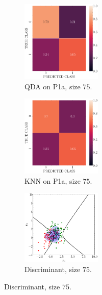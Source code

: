 \documentclass[11pt, a4 paper]{article}
\begin{document}
\begin{figure}[!htbp]
\quad    
    \begin{subfigure}[!htbp]{0.24\textwidth}
       \centering
       \includegraphics[width=1.5in]{../results/ex1/conf_mtx_QD_ML_dataset_P1a_size_75.pdf}
       \caption{QDA on P1a, size $75$.}
       \label{fig:QDA_P1a_75}
    \end{subfigure}
\quad    
    \begin{subfigure}[!htbp]{0.24\textwidth}
       \centering
       \includegraphics[width=1.5in]{../results/ex1/conf_mtx_KNN_dataset_P1a_size_75.pdf}
       \caption{KNN on P1a, size $75$.}
       \label{fig:KNN_P1a_75}
    \end{subfigure}
\quad
    \begin{subfigure}[!htbp]{0.24\textwidth}
       \centering
       \includegraphics[width=1.5in]{../results/ex1/samples_QD_ML_dataset_P1a_size_75.pdf}
       \caption{Discriminant, size $75$.}
       \label{fig:DF_P1a_75}
    \end{subfigure}
    

\end{figure}
\end{document}
